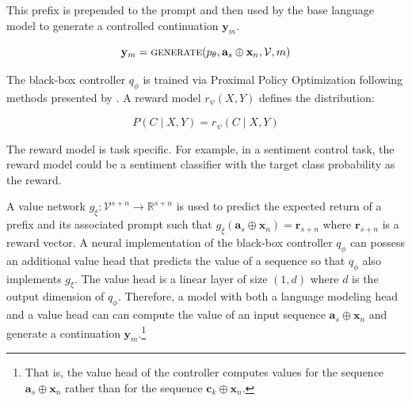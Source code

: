 \documentclass[phd,electronic,oneside,twosidetoc,letterpaper,chaptercenter,parttop,lof]{byumsphd}
\begin{document}
This prefix is prepended to the prompt and then used by the base language model to generate a controlled continuation \(\mathbf{y}_m\).

\begin{equation}
    \mathbf{y}_m = \textrm{\textsc{generate}}(p_\theta, \mathbf{a}_{s} \oplus \mathbf{x}_n, \mathcal{V}, m)
\end{equation}

The black-box controller \(q_\phi\) is trained via Proximal Policy Optimization \cite{schulman2017ppo} following methods presented by \citet{vonwerra2022trl}.
A reward model \(r_\psi(X, Y)\) defines the distribution:

\begin{equation}
    P(C \mid X, Y) = r_\psi(C \mid X, Y)
\end{equation}

The reward model is task specific. For example, in a sentiment control task, the reward model could be a sentiment classifier with the target class probability as the reward.


A value network \(g_\xi : \mathcal{V}^{s+n} \rightarrow \mathbb{R}^{s+n}\) is used to predict the expected return of a prefix and its associated prompt such that \(g_\xi(\mathbf{a}_s \oplus \mathbf{x}_n) = \mathbf{r}_{s+n}\) where \(\mathbf{r}_{s+n}\) is a reward vector.
A neural implementation of the black-box controller \(q_\phi\) can possess an additional value head that predicts the value of a sequence so that \(q_\phi\) also implements \(g_\xi\). The value head is a linear layer of size \((1, d)\) where \(d\) is the output dimension of \(q_\phi\)\citep{vonwerra2022trl}.
Therefore, a model with both a language modeling head and a value head can can compute the value of an input sequence \(\mathbf{a}_s \oplus \mathbf{x}_n\) and generate a continuation \(\mathbf{y}_m\).\footnote{That is, the value head of the controller computes values for the sequence $\mathbf{a}_s \oplus \mathbf{x}_n$  rather than for the sequence $\mathbf{c}_k \oplus \mathbf{x}_n$.}
\end{document}
